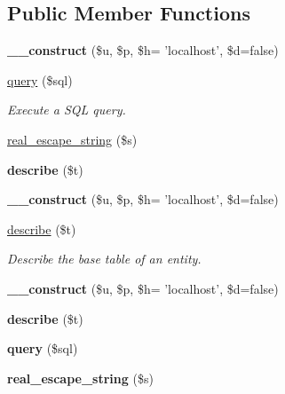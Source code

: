 \subsection*{Public Member Functions}
\begin{DoxyCompactItemize}
\item 
\hypertarget{classstore_ac6766462e1ba4cf747c89153c158e856}{{\bfseries \-\_\-\-\_\-construct} (\$u, \$p, \$h= 'localhost', \$d=false)}\label{classstore_ac6766462e1ba4cf747c89153c158e856}

\item 
\hyperlink{classstore_a65f535dfea7bcca33de5078d2bd8f18a}{query} (\$sql)
\begin{DoxyCompactList}\small\item\em Execute a S\-Q\-L query. \end{DoxyCompactList}\item 
\hyperlink{classstore_a5ba951e504b410d9442d120e9492393c}{real\-\_\-escape\-\_\-string} (\$s)
\item 
\hypertarget{classstore_ac69e064cf1e0228d17a98c91d19bc627}{{\bfseries describe} (\$t)}\label{classstore_ac69e064cf1e0228d17a98c91d19bc627}

\item 
\hypertarget{classstore_ac6766462e1ba4cf747c89153c158e856}{{\bfseries \-\_\-\-\_\-construct} (\$u, \$p, \$h= 'localhost', \$d=false)}\label{classstore_ac6766462e1ba4cf747c89153c158e856}

\item 
\hyperlink{classstore_ac69e064cf1e0228d17a98c91d19bc627}{describe} (\$t)
\begin{DoxyCompactList}\small\item\em Describe the base table of an entity. \end{DoxyCompactList}\item 
\hypertarget{classstore_ac6766462e1ba4cf747c89153c158e856}{{\bfseries \-\_\-\-\_\-construct} (\$u, \$p, \$h= 'localhost', \$d=false)}\label{classstore_ac6766462e1ba4cf747c89153c158e856}

\item 
\hypertarget{classstore_ac69e064cf1e0228d17a98c91d19bc627}{{\bfseries describe} (\$t)}\label{classstore_ac69e064cf1e0228d17a98c91d19bc627}

\item 
\hypertarget{classstore_a65f535dfea7bcca33de5078d2bd8f18a}{{\bfseries query} (\$sql)}\label{classstore_a65f535dfea7bcca33de5078d2bd8f18a}

\item 
\hypertarget{classstore_a5ba951e504b410d9442d120e9492393c}{{\bfseries real\-\_\-escape\-\_\-string} (\$s)}\label{classstore_a5ba951e504b410d9442d120e9492393c}

\end{DoxyCompactItemize}
